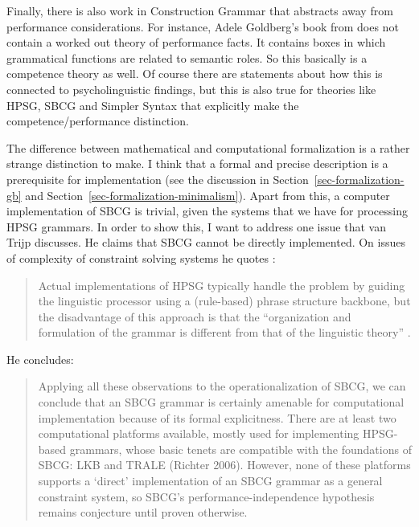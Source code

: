 \largerpage
Finally, there is also work in Construction Grammar that abstracts away from performance
considerations. For instance, Adele Goldberg's book from \citeyear{Goldberg95a} does
not contain a worked out theory of performance facts. It contains boxes in which grammatical
functions are related to semantic roles. So this basically is a competence theory as well. Of course
there are statements about how this is connected to psycholinguistic findings, but this is also true
for theories like HPSG, SBCG and Simpler Syntax \citep[]{Jackendoff2011a} that explicitly make the competence/performance distinction.


The difference between mathematical and computational formalization is a rather strange distinction to make. I
think that a formal and precise description is a prerequisite for implementation (see the discussion
in Section~\ref{sec-formalization-gb} and Section~\ref{sec-formalization-minimalism}). Apart from this, a computer implementation of SBCG is
trivial, given the systems that we have for processing HPSG grammars. In order to show this, I want
to address one issue that van Trijp discusses. He claims that SBCG cannot be directly
implemented. On issues of complexity of constraint solving systems he quotes \citep[Section~4.2.2]{LM2006a}:
\begin{quote}
Actual implementations of HPSG typically handle the problem by guiding the linguistic processor
using a (rule-based) phrase structure backbone, but the disadvantage of this approach is that the ``organization and formulation of the grammar is different from
that of the linguistic theory'' \citep[Section~4.2.2]{LM2006a}. \citep[]{vanTrijp2013a}
\end{quote}
He concludes:
\begin{quote}
Applying all these observations to the operationalization of SBCG, we can
conclude that an SBCG grammar is certainly amenable for computational implementation because of its formal explicitness. There are at least two computational
platforms available, mostly used for implementing HPSG-based grammars, whose
basic tenets are compatible with the foundations of SBCG: LKB \citep{Copestake2002a}
and TRALE (Richter 2006). However, none of these platforms supports a `direct'
implementation of an SBCG grammar as a general constraint system, so SBCG's
performance-independence hypothesis remains conjecture until proven otherwise.
\end{quote}

